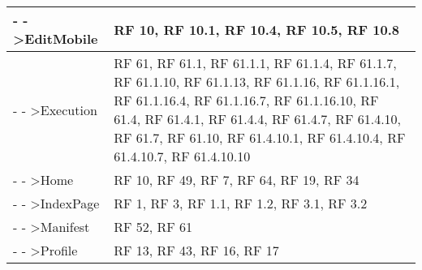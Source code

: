 {\begin{longtable} [c]{| p{8cm} | p{6cm} |}
 \hline 
- - >EditMobile & RF 10, RF 10.1, RF 10.4, RF 10.5, RF 10.8\\ 
 \hline 
- - >Execution & RF 61, RF 61.1, RF 61.1.1, RF 61.1.4, RF 61.1.7, RF 61.1.10, RF 61.1.13, RF 61.1.16, RF 61.1.16.1, RF 61.1.16.4, RF 61.1.16.7, RF 61.1.16.10, RF 61.4, RF 61.4.1, RF 61.4.4, RF 61.4.7, RF 61.4.10, RF 61.7, RF 61.10, RF 61.4.10.1, RF 61.4.10.4, RF 61.4.10.7, RF 61.4.10.10\\ 
 \hline 
- - >Home & RF 10, RF 49, RF 7, RF 64, RF 19, RF 34\\ 
 \hline 
- - >IndexPage & RF 1, RF 3, RF 1.1, RF 1.2, RF 3.1, RF 3.2\\ 
 \hline 
- - >Manifest & RF 52, RF 61\\ 
 \hline 
- - >Profile & RF 13, RF 43, RF 16, RF 17\\ 
 \hline 
\end{longtable}}
